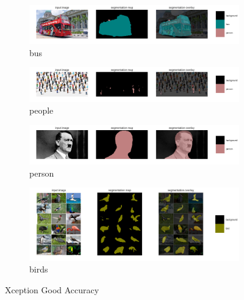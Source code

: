 \documentclass{article}
\begin{document}
\begin{figure}[h!]
\begin{subfigure}[b]{1.0\textwidth}
\includegraphics[width=\linewidth]{bus2_xception.png}
\caption{bus}
\end{subfigure}
\begin{subfigure}[b]{1.0\textwidth}
\includegraphics[width=\linewidth]{people_xception.png}
\caption{people}
\end{subfigure}
\begin{subfigure}[b]{1.0\textwidth}
\includegraphics[width=\linewidth]{person_xception.png}
\caption{person}
\end{subfigure}
\begin{subfigure}[b]{1.0\textwidth}
\includegraphics[width=\linewidth]{birds_xception.png}
\caption{birds}
\end{subfigure}
\caption{Xception Good Accuracy}
\end{figure}
\end{document}
